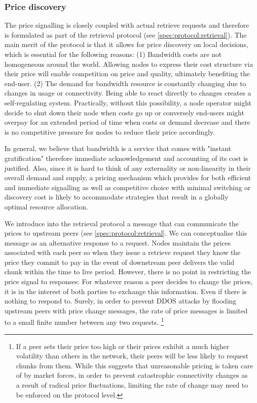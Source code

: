 \subsubsection{Price discovery}\label{sec:retrieval-price-discovery}

The price signalling is closely coupled with actual retrieve requests and therefore is formulated as part of the retrieval protocol (see \ref{spec:protocol:retrieval}). The main merit of the protocol is that it allows for price discovery on local decisions, which is essential for the following reasons: (1) Bandwidth costs are not homogeneous around the world. Allowing nodes to express their cost structure via their price will enable competition on price and quality, ultimately benefiting the end-user. (2) The demand for bandwidth resource is constantly changing due to changes in usage or connectivity. Being able to react directly to changes creates a self-regulating system. Practically, without this possibility, a node operator might decide to shut down their node when costs go up or conversely end-users might overpay for an extended period of time when costs or demand decrease and there is no competitive pressure for nodes to reduce their price accordingly. 

In general, we believe that bandwidth is a service that comes with "instant gratification" therefore immediate acknowledgement and accounting of its cost is justified. Also, since it is hard to think of any externality or non-linearity in their overall demand and supply, a pricing mechanism which provides for both efficient and immediate signalling as well as competitive choice with minimal switching or discovery cost is likely to accommodate strategies that result in a globally optimal resource allocation.

We introduce into the retrieval protocol a message that can communicate the prices to upstream peers (see \ref{spec:protocol:retrieval}. We can conceptualise this message as an alternative response to a request. Nodes maintain the prices associated with each peer so when they issue a retrieve request they know the price they commit to pay in the event of downstream peer delivers the valid chunk within the time to live period. However, there is no point in restricting the price signal to responses: For whatever reason a peer decides to change the prices, it is in the interest of both parties to exchange this information. Even if there is nothing to respond to. Surely, in order to prevent DDOS attacks by flooding upstream peers with price change messages, the rate of price messages is limited to a small finite number between any two requests.%
%
\footnote{If a peer sets their price too high or their prices exhibit a much higher volatility than others in the network, their peers will be less likely to request chunks from them. While this suggests that unreasonable pricing is taken care of by market forces, in order to prevent catastrophic connectivity changes as a result of radical price fluctuations, limiting the rate of change may need to be enforced on the protocol level.}

